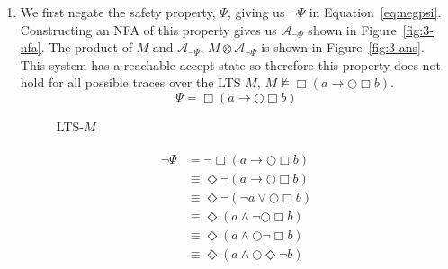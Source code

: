 \documentclass{article}
\begin{document}
\begin{enumerate}
    \item We first negate the safety property, $\Psi$, giving us $\neg\Psi$ in Equation~\ref{eq:negpsi}. Constructing an NFA of this property gives us $\mathcal{A}_{\neg\Psi}$ shown in Figure~\ref{fig:3-nfa}. The product of $M$ and $\mathcal{A}_{\neg\Psi}$, $M \otimes \mathcal{A}_{\neg\Psi}$ is shown in Figure~\ref{fig:3-ans}. This system has a reachable accept state so therefore this property does not hold for all possible traces over the LTS $M$, $M \not\models \Box\left(a \rightarrow \bigcirc\Box b\right)$.
        \begin{equation}
            \Psi = \Box\left(a \rightarrow \bigcirc\Box b\right)
        \end{equation}
        \begin{figure}[htpb]
            \centering
            \caption{LTS-$M$}%
            \label{fig:3-M}
        \end{figure}
        \begin{multline}\label{eq:negpsi}
            \begin{aligned}
                \neg\Psi &= \neg \Box(a \rightarrow \bigcirc\Box b) \\
                   &\equiv \Diamond\neg(a \rightarrow \bigcirc\Box b) \\
                   &\equiv \Diamond\neg(\neg a \vee \bigcirc\Box b) \\
                   &\equiv \Diamond(a \wedge \neg\bigcirc\Box b) \\
                   &\equiv \Diamond(a \wedge \bigcirc\neg\Box b) \\
                   &\equiv \Diamond(a \wedge \bigcirc\Diamond\neg b) 
            \end{aligned}
        \end{multline}
        \begin{figure}[htpb]
            \centering
\end{figure}
\end{enumerate}
\end{document}
